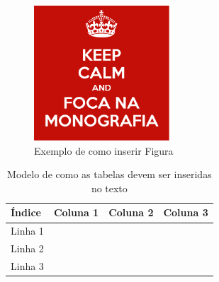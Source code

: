 \begin{figure}[htb]
    \centering
    \includegraphics[width=0.45\textwidth]{images/figura.png}
    \caption{Exemplo de como inserir Figura}
    \label{fig:exemplo}
\end{figure}

\begin{table}[htb]
\caption{Modelo de como as tabelas devem ser inseridas no texto}
\label{tb:exemplo}
\centering
\begin{tabular}{|l|c|r|r|} %
\hline
Índice  & Coluna 1 & Coluna 2 & Coluna 3 \\
\hline
Linha 1 &          &          &          \\
Linha 2 &          &          &          \\
Linha 3 &          &          &          \\
\hline
\end{tabular}
\end{table}
